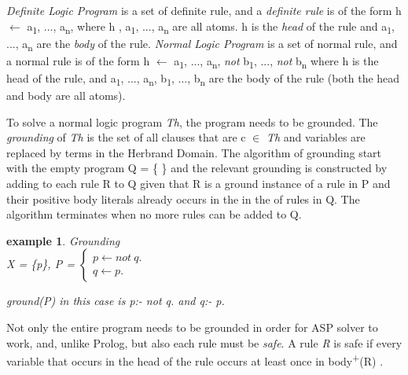 \documentclass[12pt,twoside]{report}
\newtheorem{examp}{example}[section]
\begin{document}
\textit{Definite Logic Program} is a set of definite rule, and  a \textit{definite rule} is of the form h $\leftarrow$ a\textsubscript{1}, ..., a\textsubscript{n}, where h , a\textsubscript{1}, ..., a\textsubscript{n} are all atoms. h is the \textit{head} of the rule and a\textsubscript{1}, ..., a\textsubscript{n} are the \textit{body} of the rule.
\textit{Normal Logic Program} is a set of normal rule, and a normal rule is of the form h $\leftarrow$ a\textsubscript{1}, ..., a\textsubscript{n}, \textit{not} b\textsubscript{1}, ..., \textit{not}  b\textsubscript{n} where h is the head of the rule,
 and a\textsubscript{1}, ..., a\textsubscript{n}, b\textsubscript{1}, ..., b\textsubscript{n} are the body of the rule (both the head and body are all atoms).

To solve a normal logic program \textit{Th}, the program needs to be grounded. The \textit{grounding} of \textit{Th} is the set of all clauses that are c $\in$ \textit{Th} and variables are replaced by terms in the Herbrand Domain. The algorithm of grounding start with the empty program Q = \{  \} and the relevant grounding is constructed by adding to each rule R to Q given that R is a ground instance of a rule in P and their positive body literals already occurs in the in the of rules in Q. The algorithm terminates when no more rules can be added to Q.

\begin{examp} \normalfont Grounding \\

X = \{p\}, P = $\begin{cases}
	p  \leftarrow not \ q. \\
	q  \leftarrow p.
      \end{cases}$

ground(P) in this case  is p:- not q. and q:- p. 

\end{examp}
\label{grounding}


Not only the entire program needs to be grounded in order for ASP solver to work, and, unlike Prolog,  but also each rule must be \textit{safe}. A rule \textit{R} is safe if every variable that occurs in the head of the rule occurs at least once in body\textsuperscript{+}(R) .
\end{document}
